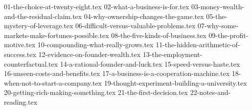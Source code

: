 
{01-the-choice-at-twenty-eight.tex}
{02-what-a-business-is-for.tex}
{03-money-wealth-and-the-residual-claim.tex}
{04-why-ownership-changes-the-game.tex}
{05-the-mystery-of-leverage.tex}
{06-difficult-versus-valuable-problems.tex}
{07-why-some-markets-make-fortunes-possible.tex}
{08-the-five-kinds-of-business.tex}
{09-the-profit-motive.tex}
{10-compounding-what-really-grows.tex}
{11-the-hidden-arithmetic-of-success.tex}
{12-evidence-on-founder-wealth.tex}
{13-the-employment-counterfactual.tex}
{14-a-rational-founder-and-luck.tex}
{15-speed-versus-haste.tex}
{16-unseen-costs-and-benefits.tex}
{17-a-business-is-a-cooperation-machine.tex}
{18-when-not-to-start-a-company.tex}
{19-thought-experiment-building-a-university.tex}
{20-getting-rich-making-something.tex}
{21-the-first-decision.tex}
{22-notes-and-reading.tex}
